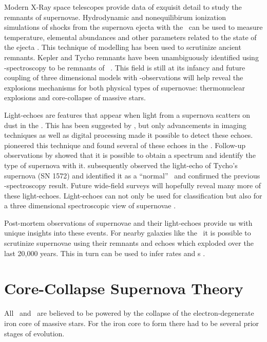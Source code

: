 Modern X-Ray space telescopes provide data of exquisit detail to study the remnants of supernovae. Hydrodynamic and nonequilibirum ionization simulations of shocks from the supernova ejecta with the \ism\ can be used to measure temperature, elemental abundances and other parameters related to the state of the ejecta \citep{2003ApJ...593..358B, 2004AstL...30..737S, 2005ApJ...624..198B}. This technique of modelling has been used to scrutinize ancient remnants. Kepler and Tycho remnants have been unambiguously identified using \xray-spectroscopy to be remnants of \sneia\ \citep{2006ApJ...645.1373B, 2007ApJ...668L.135R}. This field is still at its infancy and future coupling of three dimensional models with \xray-observations will help reveal the explosions mechanisms for both physical types of supernovae: thermonuclear explosions and core-collapse of massive stars. 

Light-echoes are features that appear when light from a supernova scatters on dust in the \ism. This has been suggested by \citet{1940RvMP...12...66Z}, but only advancements in imaging techniques as well as digital processing made it possible to detect these echoes. \cite{2005Natur.438.1132R} pioneered this technique and found several of these echoes in the \lmc. Follow-up observations by \cite{2008ApJ...680.1137R} showed that it is possible to obtain a spectrum and identify the type of supernova with it. 
\cite{2008Natur.456..617K} subsequently observed the light-echo of Tycho's supernova (SN 1572) and identified it as a ``normal'' \snia\ and confirmed the previous \xray-spectroscopy result. Future wide-field surveys will hopefully reveal many more of these light-echoes. Light-echoes can not only be used for classification but also for a three dimensional spectroscopic view of supernovae \citep[demonstrated on the example of Cassiopeia A remnant][]{2011ApJ...732....3R}.

Post-mortem observations of supernovae and their light-echoes provide us with unique insights into these events. For nearby galaxies like the \lmc\ it is possible to scrutinize supernovae using their remnants and echoes which exploded over the last 20,000 years. This in turn can be used to infer rates and \dtd s \citep{2010MNRAS.407.1314M}.
\newpage
\section{Core-Collapse Supernova Theory}

All \snii\ and \snibc\ are believed to be powered by the collapse of the electron-degenerate iron core of massive stars. For the iron core to form there had to be several prior stages of evolution.

